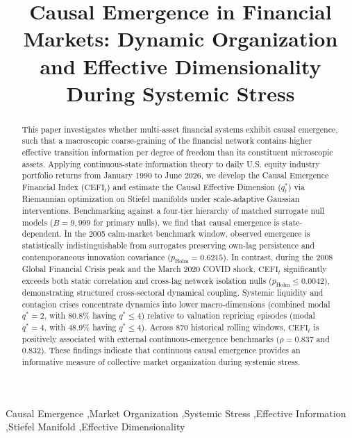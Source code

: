 \documentclass[review,12pt,authoryear]{elsarticle}
\begin{document}
\begin{frontmatter}

\title{Causal Emergence in Financial Markets: Dynamic Organization and Effective Dimensionality During Systemic Stress}

\author{}

\begin{abstract}
This paper investigates whether multi-asset financial systems exhibit causal emergence, such that a macroscopic coarse-graining of the financial network contains higher effective transition information per degree of freedom than its constituent microscopic assets. Applying continuous-state information theory to daily U.S. equity industry portfolio returns from January 1990 to June 2026, we develop the Causal Emergence Financial Index ($\mathrm{CEFI}_t$) and estimate the Causal Effective Dimension ($q_t^*$) via Riemannian optimization on Stiefel manifolds under scale-adaptive Gaussian interventions. Benchmarking against a four-tier hierarchy of matched surrogate null models ($B=9,999$ for primary nulls), we find that causal emergence is state-dependent. In the 2005 calm-market benchmark window, observed emergence is statistically indistinguishable from surrogates preserving own-lag persistence and contemporaneous innovation covariance ($p_{\text{Holm}} = 0.6215$). In contrast, during the 2008 Global Financial Crisis peak and the March 2020 COVID shock, $\mathrm{CEFI}_t$ significantly exceeds both static correlation and cross-lag network isolation nulls ($p_{\text{Holm}} \le 0.0042$), demonstrating structured cross-sectoral dynamical coupling. Systemic liquidity and contagion crises concentrate dynamics into lower macro-dimensions (combined modal $q^* = 2$, with 80.8\% having $q^* \le 4$) relative to valuation repricing episodes (modal $q^* = 4$, with 48.9\% having $q^* \le 4$). Across 870 historical rolling windows, $\mathrm{CEFI}_t$ is positively associated with external continuous-emergence benchmarks ($\rho = 0.837$ and $0.832$). These findings indicate that continuous causal emergence provides an informative measure of collective market organization during systemic stress.
\end{abstract}

\begin{keyword}
Causal Emergence \sep Market Organization \sep Systemic Stress \sep Effective Information \sep Stiefel Manifold \sep Effective Dimensionality
\end{keyword}

\end{frontmatter}
\end{document}
